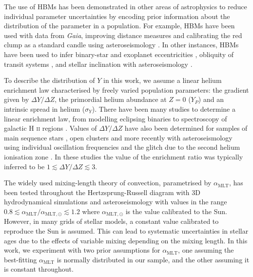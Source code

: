 \documentclass[a4paper,fleqn,usenatbib]{mnras}
\newcommand{\mlt}{\ensuremath{{\alpha_\mathrm{MLT}}}}
\begin{document}
The use of HBMs has been demonstrated in other areas of astrophysics to reduce individual parameter uncertainties by encoding prior information about the distribution of the parameter in a population. For example, HBMs have been used with data from \emph{Gaia}, improving distance measures \citep{Leistedt.Hogg2017, Anderson.Hogg.ea2018} and calibrating the red clump as a standard candle \citep{Hawkins.Leistedt.ea2017, Chan.Bovy2020} using asteroseismology \citep{Hall.Davies.ea2019}. In other instances, HBMs have been used to infer binary-star and exoplanet eccentricities \citep{Hogg.Myers.ea2010}, obliquity of transit systems \citep{Morton.Winn2014}, and stellar inclination with asteroseismology \citep{Campante.Lund.ea2016, Kuszlewicz.Chaplin.ea2019}.

To describe the distribution of $Y$ in this work, we assume a linear helium enrichment law characterised by freely varied population parameters: the gradient given by $\Delta Y / \Delta Z$, the primordial helium abundance at $Z=0$ ($Y_P$) and an intrinsic spread in helium ($\sigma_Y$). There have been many studies to determine a linear enrichment law, from modelling eclipsing binaries \citep{Ribas.Jordi.ea2000} to spectroscopy of galactic H \textsc{ii} regions \citep{Balser2006}. Values of $\Delta Y / \Delta Z$ have also been determined for samples of main sequence stars \citep{Casagrande.Flynn.ea2007}, open clusters \citep{Brogaard.VandenBerg.ea2012} and more recently with asteroseismology using individual oscillation frequencies \citep{SilvaAguirre.Lund.ea2017} and the glitch due to the second helium ionisation zone \citep{Verma.Raodeo.ea2019}. In these studies the value of the enrichment ratio was typically inferred to be $1 \lesssim \Delta Y / \Delta Z \lesssim 3$.

The widely used mixing-length theory of convection, parametrised by $\mlt$, has been tested throughout the Hertzsprung-Russell diagram with 3D hydrodynamical simulations \citep{Trampedach.Stein.ea2014, Magic.Weiss.ea2015} and asteroseismology \citep{Tayar.Somers.ea2017, Viani.Basu.ea2018, Li.Bedding.ea2018} with values in the range $0.8 \lesssim \mlt/\alpha_{\mathrm{MLT}, \odot} \lesssim 1.2$ where $\alpha_{\mathrm{MLT}, \odot}$ is the value calibrated to the Sun. However, in many grids of stellar models, a constant value calibrated to reproduce the Sun is assumed. This can lead to systematic uncertainties in stellar ages due to the effects of variable mixing depending on the mixing length. In this work, we experiment with two prior assumptions for $\mlt$, one assuming the best-fitting $\mlt$ is normally distributed in our sample, and the other assuming it is constant throughout.
\end{document}
